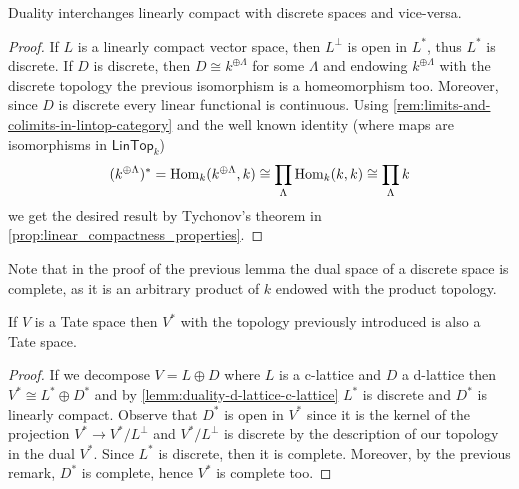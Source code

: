 \begin{lemma}\label{lemm:duality-d-lattice-c-lattice}
	Duality interchanges linearly compact with discrete spaces and vice-versa. 
\end{lemma}
\begin{proof}
	If $L$ is a linearly compact vector space, then $L^{\perp}$ is open in $L^{*}$, thus $L^{*}$ is discrete. If $D$ is discrete, then $D \cong k^{\oplus \Lambda}$ for some $\Lambda$ and endowing $k^{\oplus \Lambda}$ with the discrete topology the previous isomorphism is a homeomorphism too. Moreover, since $D$ is discrete every linear functional is continuous. Using \cref{rem:limits-and-colimits-in-lintop-category} and the well known identity (where maps are isomorphisms in $\mathsf{LinTop}_{k}$)
	\[
		(k^{\oplus \Lambda})^{*} = \operatorname{Hom}_{k}(k^{\oplus \Lambda}, k) \cong \prod_{\Lambda} \operatorname{Hom}_{k}(k, k) \cong \prod_{\Lambda} k
	\]
	we get the desired result by Tychonov's theorem in \cref{prop:linear_compactness_properties}. 
\end{proof}
\begin{remark}\label{rem:dual-of-discrete-is-complete}
	Note that in the proof of the previous lemma the dual space of a discrete space is complete, as it is an arbitrary product of $k$ endowed with the product topology.
\end{remark}
\begin{proposition}\label{prop:dual-space-is-tate}
	If $V$ is a Tate space then $V^{*}$ with the topology previously introduced is also a Tate space.
\end{proposition}
\begin{proof}
	If we decompose $V = L \oplus D$ where $L$ is a c-lattice and $D$ a d-lattice then $V^{*} \cong L^{*} \oplus D^{*}$ and by \cref{lemm:duality-d-lattice-c-lattice} $L^{*}$ is discrete and $D^{*}$ is linearly compact. Observe that $D^{*}$ is open in $V^{*}$ since it is the kernel of the projection $V^{*} \to V^{*}/L^{\perp}$ and $V^{*}/L^{\perp}$ is discrete by the description of our topology in the dual $V^{*}$. Since $L^{*}$ is discrete, then it is complete. Moreover, by the previous remark, $D^{*}$ is complete, hence $V^{*}$ is complete too.
\end{proof}

